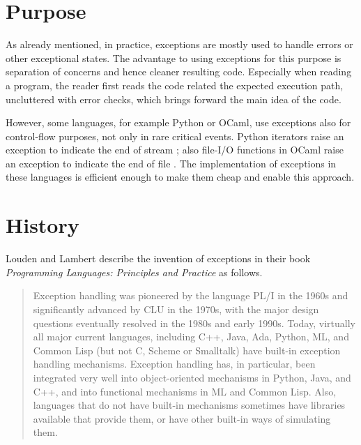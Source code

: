 
\section{Purpose}

As already mentioned, in practice, exceptions are mostly used to handle errors or
other exceptional states. The advantage to using
exceptions for this purpose is separation of concerns and hence cleaner resulting code.
Especially when reading a program, the reader first reads the code related the expected
execution path, uncluttered with error checks, which brings forward the main idea
of the code.

However, some languages, for example Python or OCaml, use exceptions also for control-flow
purposes, not only in rare critical events. Python iterators raise an exception to
indicate the end of stream \cite{python:reference}; also file-I/O functions in OCaml raise
an exception to indicate the end of file \cite{ocaml:reference}. The implementation of
exceptions in these languages is efficient enough to make them cheap and enable this approach.



\section{History}

Louden and Lambert describe the invention of exceptions in their book
\emph{Programming Languages: Principles and Practice} as follows.

\begin{quote}
Exception handling was pioneered by the language PL/I in the 1960s and
significantly advanced by CLU in the 1970s, with the major design questions
eventually resolved in the 1980s and early 1990s. Today, virtually all major
current languages, including C++, Java, Ada, Python, ML, and Common Lisp (but
not C, Scheme or Smalltalk) have built-in exception handling mechanisms.
Exception handling has, in particular, been integrated very well into
object-oriented mechanisms in Python, Java, and C++, and into functional
mechanisms in ML and Common Lisp. Also, languages that do not have built-in
mechanisms sometimes have libraries available that provide them, or have other
built-in ways of simulating them. \cite[p.~423]{louden:languages}
\end{quote}

